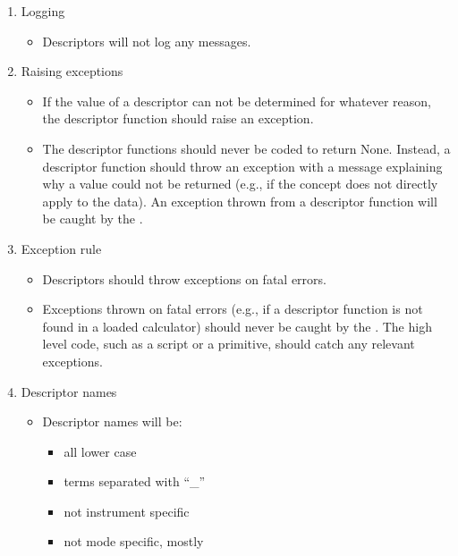 \documentclass[letterpaper,10pt,english]{sphinxmanual}
\begin{document}
\begin{enumerate}
\begin{itemize}
\end{itemize}

\item {} 
Logging
\begin{itemize}
\item {} 
Descriptors will not log any messages.

\end{itemize}

\item {} 
Raising exceptions
\begin{itemize}
\item {} 
If the value of a descriptor can not be determined for whatever reason,
the descriptor function should raise an exception.

\item {} 
The descriptor functions should never be coded to return None. Instead,
a descriptor function should throw an exception with a message
explaining why a value could not be returned (e.g., if the concept does
not directly apply to the data). An exception thrown from a descriptor
function will be caught by the .

\end{itemize}

\item {} 
Exception rule
\begin{itemize}
\item {} 
Descriptors should throw exceptions on fatal errors.

\item {} 
Exceptions thrown on fatal errors (e.g., if a descriptor function is not
found in a loaded calculator) should never be caught by the . The
high level code, such as a script or a primitive, should catch any
relevant exceptions.

\end{itemize}

\item {} 
Descriptor names
\begin{itemize}
\item {} 
Descriptor names will be:
\begin{itemize}
\item {} 
all lower case

\item {} 
terms separated with ``\_''

\item {} 
not instrument specific

\item {} 
not mode specific, mostly


\end{itemize}
\end{itemize}
\end{enumerate}
\end{document}
